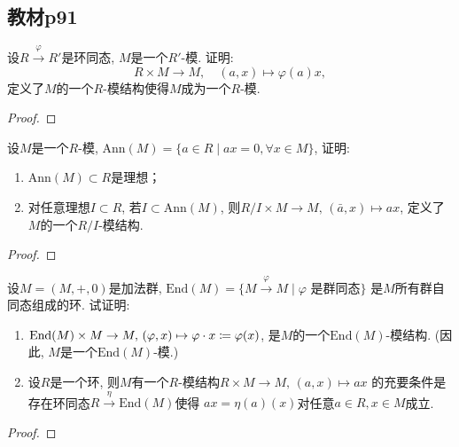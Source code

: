 \subsection{教材p91}

\begin{problem}
    设$R \xrightarrow{\varphi} R'$是环同态, $M$是一个$R'$-模.
证明: 
\[
    R \times M \to M,\quad (a, x) \mapsto \varphi(a)x,
\]
定义了$M$的一个$R$-模结构使得$M$成为一个$R$-模.
\end{problem}

\begin{proof}
    
\end{proof}

\begin{problem}
    设$M$是一个$R$-模, $\mathrm{Ann}(M) = \{a \in R \mid ax = 0, \forall x \in M\}$,
证明: 
\begin{enumerate}[(1)]
    \item $\mathrm{Ann}(M) \subset R$是理想；
    \item 对任意理想$I \subset R$, 若$I \subset \mathrm{Ann}(M)$,
则$R/I \times M \to M,\, (\bar{a},x) \mapsto ax$,
定义了$M$的一个$R/I$-模结构.
\end{enumerate}
\end{problem}

\begin{proof}
    
\end{proof}

\begin{problem}
    设$M = (M, +, 0)$是加法群, $\mathrm{End}(M) = \{M \xrightarrow{\varphi} M \mid \varphi \text{ 是群同态}\}$
    是$M$所有群自同态组成的环. 试证明: 
\begin{enumerate}[(1)]
    \item $\mathrm{End}(M) \times M \to M,\, (\varphi, x) \mapsto \varphi \cdot x \mathrel{\coloneqq} \varphi(x)$,
是$M$的一个$\mathrm{End}(M)$-模结构. (因此, $M$是一个$\mathrm{End}(M)$-模.)
    \item 设$R$是一个环, 则$M$有一个$R$-模结构$R \times M \to M,\, (a, x) \mapsto ax$
的充要条件是存在环同态$R \xrightarrow{\eta} \mathrm{End}(M)$使得
$ax = \eta(a)(x)$对任意$a \in R, x \in M$成立.
\end{enumerate}
\end{problem}

\begin{proof}

\end{proof}


